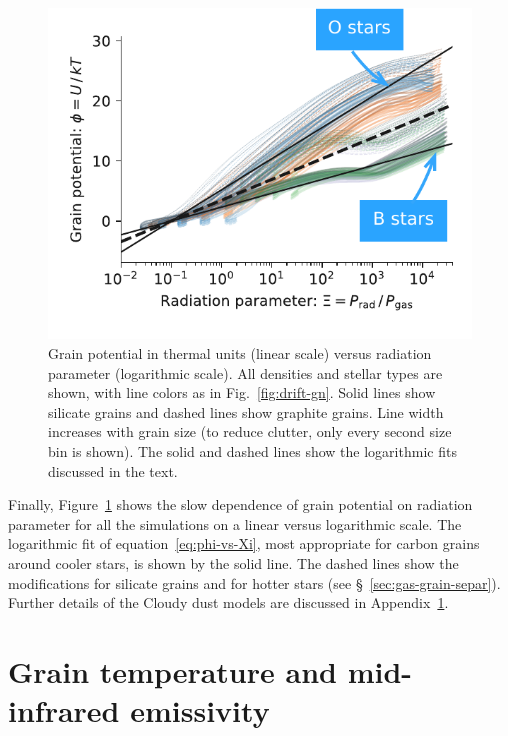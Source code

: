 \begin{figure}
  \centering
  \includegraphics[width=\linewidth]{figs/phi-versus-xi-annotate}
  \caption{Grain potential in thermal units (linear scale) versus
    radiation parameter (logarithmic scale). All densities and stellar
    types are shown, with line colors as in Fig.~\ref{fig:drift-gn}.
    Solid lines show silicate grains and dashed lines show graphite
    grains.  Line width increases with grain size (to reduce clutter,
    only every second size bin is shown).  The solid and dashed lines
    show the logarithmic fits discussed in the text.}
  \label{fig:phi-vs-Xi}
\end{figure}
Finally, Figure~\ref{fig:phi-vs-Xi} shows the slow dependence of grain
potential on radiation parameter for all the simulations on a linear
versus logarithmic scale.  The logarithmic fit of
equation~\eqref{eq:phi-vs-Xi}, most appropriate for carbon grains
around cooler stars, is shown by the solid line.  The dashed lines
show the modifications for silicate grains and for hotter stars (see
\S~\ref{sec:gas-grain-separ}).  Further details of the Cloudy dust
models are discussed in Appendix~\ref{sec:grain-temp-emiss}.


\section{Grain temperature and mid-infrared emissivity}
\label{sec:grain-temp-emiss}

